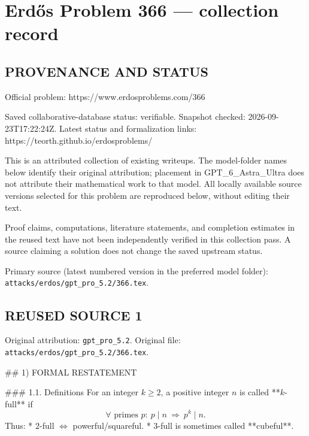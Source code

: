 \section*{Erd\H{o}s Problem 366 --- collection record}

\subsection*{PROVENANCE AND STATUS}
Official problem: https://www.erdosproblems.com/366

Saved collaborative-database status: verifiable.
Snapshot checked: 2026-09-23T17:22:24Z.
Latest status and formalization links: https://teorth.github.io/erdosproblems/

This is an attributed collection of existing writeups. The model-folder names below identify their original attribution; placement in GPT\_6\_Astra\_Ultra does not attribute their mathematical work to that model. All locally available source versions selected for this problem are reproduced below, without editing their text.

Proof claims, computations, literature statements, and completion estimates in the reused text have not been independently verified in this collection pass. A source claiming a solution does not change the saved upstream status.

Primary source (latest numbered version in the preferred model folder): \texttt{attacks/erdos/gpt\_pro\_5.2/366.tex}.

\subsection*{REUSED SOURCE 1}
Original attribution: \texttt{gpt\_pro\_5.2}.
Original file: \texttt{attacks/erdos/gpt\_pro\_5.2/366.tex}.


## 1) FORMAL RESTATEMENT

### 1.1. Definitions
For an integer \(k\ge 2\), a positive integer \(n\) is called **\(k\)-full** if
\[
\forall\text{ primes }p:\ p\mid n\ \Rightarrow\ p^k\mid n.
\]
Thus:
* \(2\)-full \(\Leftrightarrow\) powerful/squareful.
* \(3\)-full is sometimes called **cubeful**.


